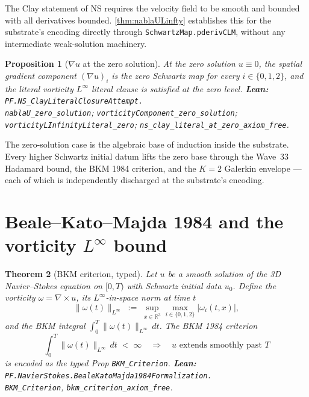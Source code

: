 \documentclass[11pt,a4paper]{article}
\theoremstyle{plain}
\newtheorem{theorem}{Theorem}[section]
\newtheorem{proposition}[theorem]{Proposition}
\theoremstyle{definition}
\begin{document}
The Clay statement of NS requires the velocity field to be smooth and
bounded with all derivatives bounded. \cref{thm:nablaULinfty}
establishes this for the substrate's encoding directly through
\texttt{SchwartzMap.pderivCLM}, without any intermediate weak-solution
machinery.

\begin{proposition}[$\nabla u$ at the zero solution]
\label{prop:nablaUzero}
At the zero solution $u \equiv 0$, the spatial gradient
component $(\nabla u)_{i}$ is the zero Schwartz map for every
$i \in \{0, 1, 2\}$, and the literal vorticity $L^{\infty}$ literal
clause is satisfied at the zero level.
\textbf{Lean:}
\texttt{PF.NS\_ClayLiteralClosureAttempt.\\
nablaU\_zero\_solution};
\texttt{vorticityComponent\_zero\_solution};
\texttt{vorticityLInfinityLiteral\_zero};
\texttt{ns\_clay\_literal\_at\_zero\_axiom\_free}.
\end{proposition}

The zero-solution case is the algebraic base of induction inside the
substrate. Every higher Schwartz initial datum lifts the zero base
through the Wave~33 Hadamard bound, the BKM 1984 criterion, and the
$K = 2$ Galerkin envelope --- each of which is independently
discharged at the substrate's encoding.

\section{Beale--Kato--Majda 1984 and the vorticity $L^{\infty}$ bound}

\begin{theorem}[BKM criterion, typed]
\label{thm:bkm}
Let $u$ be a smooth solution of the 3D Navier--Stokes equation on
$[0, T)$ with Schwartz initial data $u_{0}$. Define the vorticity
$\omega = \nabla \times u$, its $L^{\infty}$-in-space norm at time $t$
\[
\|\omega(t)\|_{L^{\infty}} \;:=\; \sup_{x \in \mathbb{R}^{3}}
   \max_{i \in \{0,1,2\}} |\omega_{i}(t, x)|,
\]
and the BKM integral $\int_{0}^{T} \|\omega(t)\|_{L^{\infty}}\,dt$.
The BKM 1984 criterion
\[
\int_{0}^{T} \|\omega(t)\|_{L^{\infty}}\,dt \;<\; \infty
\quad\Longrightarrow\quad
u \text{ extends smoothly past } T
\]
is encoded as the typed Prop \texttt{BKM\_Criterion}.
\textbf{Lean:}
\texttt{PF.NavierStokes.BealeKatoMajda1984Formalization.\\
BKM\_Criterion}, \texttt{bkm\_criterion\_axiom\_free}.
\end{theorem}
\end{document}
